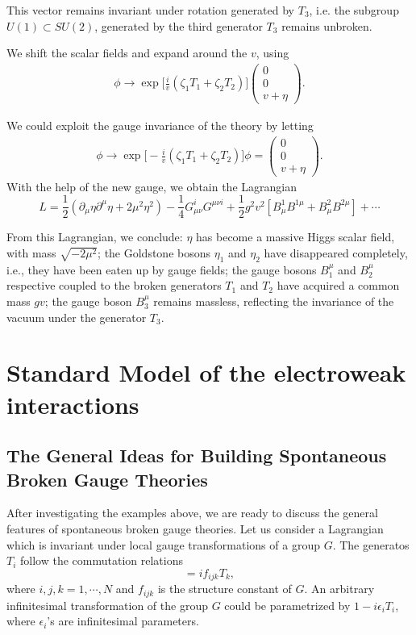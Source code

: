 This vector remains invariant under rotation generated by $T_3$, i.e. the subgroup $U(1)\subset SU(2)$, generated by the third generator $T_3$ remains unbroken.

We shift the scalar fields and expand around the $v$, using 
\begin{eqnarray}
\phi \to \exp\biggl[\frac{i}{v}(\zeta_1 T_1+\zeta_2 T_2)  \biggr]
\left(
\begin{array}{c}
	0\\0\\v+\eta
\end{array}
\right).
\end{eqnarray}

We could exploit the gauge invariance of the theory by letting
\begin{eqnarray}
\phi \to \exp\biggl[-\frac{i}{v}(\zeta_1 T_1+\zeta_2 T_2)  \biggr]
\phi=\left(
\begin{array}{c}
0\\0\\v+\eta
\end{array}
\right).
\end{eqnarray}
With the help of the new gauge, we obtain the Lagrangian
\begin{equation}
L=\frac{1}{2}(\partial_\mu\eta\partial^\mu\eta+2\mu^2\eta^2)-\frac{1}{4}G_{\mu\nu}^i G^{\mu\nu i}+\frac{1}{2}g^2v^2[B^1_\mu B^{1\mu}+B^2_\mu B^{2\mu}]+\cdots
\end{equation}

From this Lagrangian, we conclude: $\eta$ has become a massive Higgs scalar field, with mass $\sqrt{-2\mu^2}$; the Goldstone bosons $\eta_1$ and $\eta_2$ have disappeared completely, i.e., they have been eaten up by gauge fields; the gauge bosons $B^{\mu}_1$ and $B^\mu_2$ respective coupled to the broken generators $T_1$ and $T_2$ have acquired a common mass $gv$; the gauge boson $B^\mu_3$ remains massless, reflecting the invariance of the vacuum under the generator $T_3$.


\section{Standard Model of the electroweak interactions}
\subsection{The General Ideas for Building Spontaneous Broken Gauge Theories }
After investigating the examples above, we are ready to discuss the general features of spontaneous broken gauge theories. Let us consider a Lagrangian which is invariant under local gauge transformations of a group $G$. The generatos $T_i$ follow the commutation relations
\begin{equation}
[T_i, T_j]=if_{ijk}T_k,
\end{equation}
where $i,j,k = 1,\cdots,N$ and $f_{ijk}$ is the structure constant of $G$. An arbitrary infinitesimal transformation of the group $G$ could be parametrized by $1-i\epsilon_i T_i$, where $\epsilon_i$'s are infinitesimal parameters.

